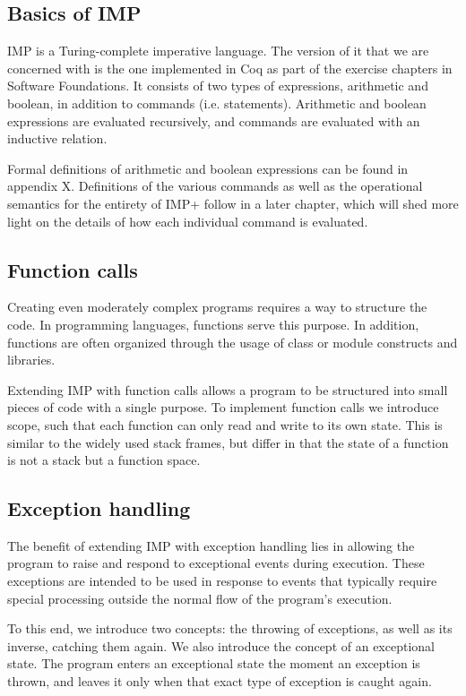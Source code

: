 \subsection{Basics of IMP}
IMP is a Turing-complete imperative language. The version of it that we are concerned with is the one implemented in Coq as part of the exercise chapters in Software Foundations. It consists of two types of expressions, arithmetic and boolean, in addition to commands (i.e. statements). Arithmetic and boolean expressions are evaluated recursively, and commands are evaluated with an inductive relation.

Formal definitions of arithmetic and boolean expressions can be found in appendix X. Definitions of the various commands as well as the operational semantics for the entirety of IMP+ follow in a later chapter, which will shed more light on the details of how each individual command is evaluated.

\subsection{Function calls}

Creating even moderately complex programs requires a way to structure the code. In programming languages, functions serve this purpose. In addition, functions are often organized through the usage of class or module constructs and libraries.

Extending IMP with function calls allows a program to be structured into small pieces of code with a single purpose. To implement function calls we introduce scope, such that each function can only read and write to its own state. This is similar to the widely used stack frames, but differ in that the state of a function is not a stack but a function space.

\subsection{Exception handling}

The benefit of extending IMP with exception handling lies in allowing the program to raise and respond to exceptional events during execution. These exceptions are intended to be used in response to events that typically require special processing outside the normal flow of the program's execution.

To this end, we introduce two concepts: the throwing of exceptions, as well as its inverse, catching them again. We also introduce the concept of an exceptional state. The program enters an exceptional state the moment an exception is thrown, and leaves it only when that exact type of exception is caught again.

